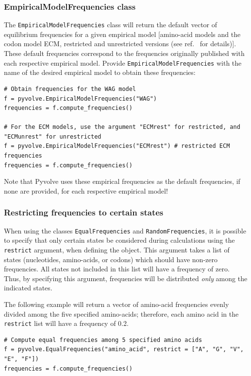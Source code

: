 \documentclass{article}
\newcommand{\code}[1]{\texttt{\small{#1}}}
\begin{document}
\subsubsection{EmpiricalModelFrequencies class}
The \code{EmpiricalModelFrequencies} class will return the default vector of equilibrium frequencies for a given empirical model [amino-acid models and the codon model ECM, restricted and unrestricted versions (see ref.\ \citep{ECM} for details)]. These default frequencies correspond to the frequencies originally published with each respective empirical model. Provide \code{EmpiricalModelFrequencies} with the name of the desired empirical model to obtain these frequencies:
\begin{lstlisting}
# Obtain frequencies for the WAG model
f = pyvolve.EmpiricalModelFrequencies("WAG")
frequencies = f.compute_frequencies()

# For the ECM models, use the argument "ECMrest" for restricted, and "ECMunrest" for unrestricted
f = pyvolve.EmpiricalModelFrequencies("ECMrest") # restricted ECM frequencies
frequencies = f.compute_frequencies()
\end{lstlisting}
Note that Pyvolve uses these empirical frequencies as the default frequencies, if none are provided, for each respective empirical model!


\subsubsection{Restricting frequencies to certain states}

When using the classes \code{EqualFrequencies} and \code{RandomFrequencies}, it is possible to specify that only certain states be considered during calculations using the \code{restrict} argument, when defining the object. This argument takes a list of states (nucleotides, amino-acids, or codons) which should have non-zero frequencies. All states not included in this list will have a frequency of zero. Thus, by specifying this argument, frequencies will be distributed \emph{only} among the indicated states.

The following example will return a vector of amino-acid frequencies evenly divided among the five specified amino-acids; therefore, each amino acid in the \code{restrict} list will have a frequency of 0.2.
\begin{lstlisting}
# Compute equal frequencies among 5 specified amino acids
f = pyvolve.EqualFrequencies("amino_acid", restrict = ["A", "G", "V", "E", "F"])
frequencies = f.compute_frequencies()
\end{lstlisting}
\end{document}
